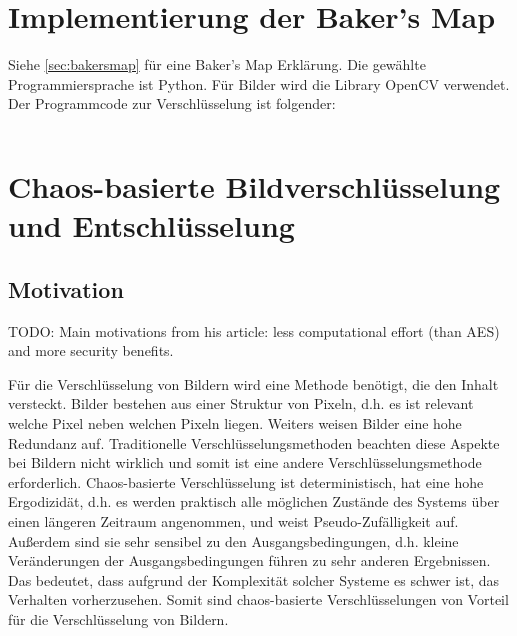 
\usepackage[naustrian]{babel}


\maketitle

\section{Implementierung der Baker's Map}
Siehe \ref{sec:bakersmap} für eine Baker's Map Erklärung. Die gewählte Programmiersprache ist Python.
Für Bilder wird die Library OpenCV verwendet. Der Programmcode zur Verschlüsselung ist folgender:
\begin{lstlisting}
\end{lstlisting}

\section{Chaos-basierte Bildverschlüsselung und Entschlüsselung}
\subsection{Motivation}
TODO: Main motivations from his article: less computational effort (than AES) and more security benefits.

Für die Verschlüsselung von Bildern wird eine Methode benötigt, die den Inhalt
versteckt. Bilder bestehen aus einer Struktur von Pixeln, d.h. es ist relevant welche Pixel neben welchen
Pixeln liegen. Weiters weisen Bilder eine hohe Redundanz auf. Traditionelle Verschlüsselungsmethoden beachten
diese Aspekte bei Bildern nicht wirklich und somit ist eine andere Verschlüsselungsmethode erforderlich.
Chaos-basierte Verschlüsselung ist deterministisch, hat eine hohe Ergodizidät, d.h. es werden praktisch alle
möglichen Zustände des Systems über einen längeren Zeitraum angenommen, und weist Pseudo-Zufälligkeit auf. Außerdem
sind sie sehr sensibel zu den Ausgangsbedingungen, d.h. kleine Veränderungen der Ausgangsbedingungen führen zu
sehr anderen Ergebnissen. Das bedeutet, dass aufgrund der Komplexität solcher Systeme es schwer ist,
das Verhalten vorherzusehen.
Somit sind chaos-basierte Verschlüsselungen von Vorteil für die Verschlüsselung von Bildern.
\cite{zhang2023}


